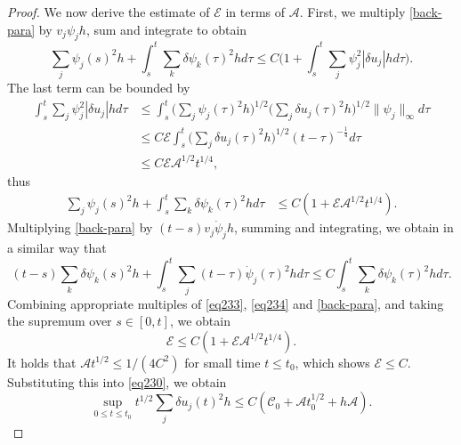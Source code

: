 \documentclass[10pt,a4paper]{amsart}
\begin{document}
\begin{proof}
We now derive  the estimate of $\mathscr{E}$ in terms of $\mathscr{A}$.
First, we multiply \eqref{back-para} by \(v_j\psi_jh\), sum and integrate to obtain
$$\sum_{j}\psi_{j}(s)^{2}h+\int_{s}^{t}\sum\limits_{k}\delta\psi_{k}(\tau)^{2}hd\tau\leq C\Big(1+\int_{s}^{t}\sum_{j}\psi_{j}^{2}|\delta u_{j}|hd\tau\Big).$$
The last term can be bounded by
\begin{equation*}
\begin{aligned}
\int_{s}^{t}\sum_{j}\psi_{j}^{2}|\delta u_{j}|hd\tau
&\leq\int_{s}^{t}\Big(\sum_{j}\psi_{j}(\tau)^{2}h\Big)^{1/2}\Big(\sum_{j}\delta u_{j}(\tau)^{2}h\Big)^{1/2}\|\psi_j\|_\infty d\tau\\
&\leq C{\mathscr{E}}\int_{s}^{t}\Big(\sum_{j}\delta u_{j}(\tau)^{2}h\Big)^{1/2}(t-\tau)^{-\frac14} d\tau\\
&\leq C{\mathscr{E}}{\mathscr{A}}^{1/2}t^{1/4},
\end{aligned}
\end{equation*}
thus
\begin{equation}\label{eq233}
\begin{aligned}
\sum_{j}\psi_{j}(s)^{2}h+\int_{s}^{t}\sum\limits_{k}\delta\psi_{k}(\tau)^{2}hd\tau
&\leq C(1+{\mathscr{E}}{\mathscr{A}}^{1/2}t^{1/4}).
\end{aligned}
\end{equation}
Multiplying \eqref{back-para} by \(\left(t-s\right)v_{j}\dot{\psi}_{j}h\), summing
and integrating, we obtain in a similar way that
\begin{equation}\label{eq234}
(t-s)\sum\limits_{k}\delta\psi_{k}(s)^{2}h+\int_{s}^{t}\sum\limits_{j}(t-\tau)\dot{\psi}_{j}(\tau)^{2}hd\tau\leq C\int_{s}^{t}\sum\limits_{k}\delta\psi_{k}(\tau)^{2}hd\tau.\end{equation}
Combining appropriate multiples of \eqref{eq233}, \eqref{eq234} and \eqref{back-para}, and taking the
supremum over \(s\in[0,t]\), we obtain
\begin{equation}\label{eq231}
\mathscr{E}\leq C(1+\mathscr{E}\mathscr{A}^{1/2}t^{1/4}).  
\end{equation}
It holds that \(\mathscr{A}t^{1/2}\leq1/(4C^{2})\) for small time $t\leq t_0$, which shows \(\mathscr{E}\leq C\). Substituting this into \eqref{eq230}, we obtain 
\begin{equation}\label{eq:est-ux}
\sup_{0\leq t\leq t_{0}}t^{1/2}\sum_{j}\delta u_{j}(t)^{2}h\leq C(\mathscr{C}_{0}+\mathscr{A}t_0^{1/2}+ h\mathscr{A}).\end{equation}


\end{proof}
\end{document}

